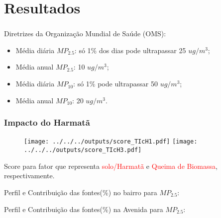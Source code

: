 \section{Resultados}


\begin{frame}
  \frametitle{}
  \begin{table}
    
  \end{table}
   Diretrizes da Organização Mundial de Saúde (OMS):
  \begin{itemize}
    \item Média diária $MP_{2.5}$: só 1\% dos dias pode ultrapassar 25 $ug/m^3$;
    \item Média anual $MP_{2.5}$: 10 $ug/m^3$;
    \item Média diária $MP_{10}$: só 1\%  pode ultrapassar 50 $ug/m^3$;
    \item Média anual $MP_{10}$: 20 $ug/m^3$.
  \end{itemize}
\end{frame}

\begin{frame}
  \frametitle{}
    
\end{frame}

\begin{frame}
  \frametitle{}
    
\end{frame}

\begin{frame}
  \frametitle{Impacto do Harmatã}
  \begin{figure}[H]
   \centering
    \texttt{[image: ../../../outputs/score\_TIcH1.pdf]}
    \texttt{[image: ../../../outputs/score\_TIcH3.pdf]}
  \end{figure}
   Score para fator que representa \textcolor{red}{solo/Harmatã} 
   e \textcolor{red}{Queima de Biomassa}, respectivamente.
\end{frame}

\begin{frame}
    Perfil e Contribuição das fontes(\%) no bairro para $MP_{2.5}$:
    \begin{tiny}
      
      
    \end{tiny}
\end{frame}

\begin{frame}
    Perfil e Contribuição das fontes(\%) na Avenida para $MP_{2.5}$:
    \begin{tiny}
      
      
    \end{tiny}
\end{frame}



